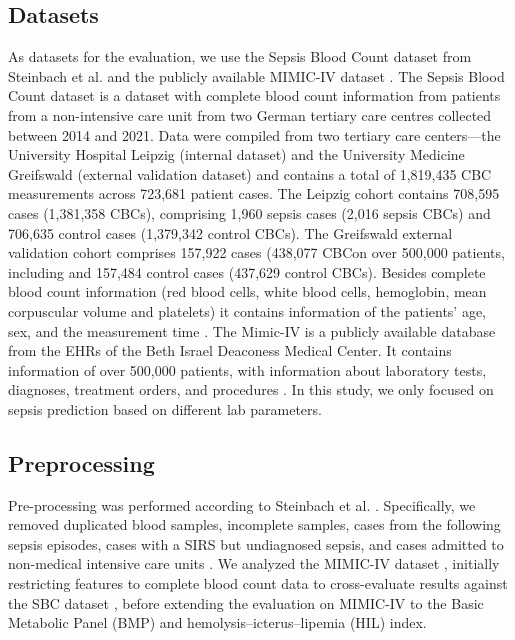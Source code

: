 \documentclass[pdflatex,sn-mathphys-num,lineno]{sn-jnl}
\theoremstyle{thmstyleone}%
\theoremstyle{thmstyletwo}%
\theoremstyle{thmstylethree}%
\begin{document}
\subsection{Datasets}\label{methods:datasets}
As datasets for the evaluation, we use the Sepsis Blood Count dataset from Steinbach et al. \cite{steinbach2024applying} and the publicly available MIMIC-IV dataset \cite{johnson2023mimic}. 
The Sepsis Blood Count dataset is a dataset with complete blood count information from patients from a non-intensive care unit from two German tertiary care centres collected between 2014 and 2021. Data were compiled from two tertiary care centers—the University Hospital Leipzig (internal dataset) and the University Medicine Greifswald (external validation dataset) and contains a total of 1,819,435 CBC measurements across 723,681 patient cases. The Leipzig cohort contains 708,595 cases (1,381,358 CBCs), comprising 1,960 sepsis cases (2,016 sepsis CBCs) and 706,635 control cases (1,379,342 control CBCs). The Greifswald external validation cohort comprises 157,922 cases (438,077 CBCon over 500,000 patients, including and 157,484 control cases (437,629 control CBCs). Besides complete blood count information (red blood cells, white blood cells, hemoglobin, mean corpuscular volume and platelets) it contains information of the patients' age, sex, and the measurement time \cite{steinbach2024applying}. 
The Mimic-IV \cite{johnson2023mimic} is a publicly available database from the EHRs of the Beth Israel Deaconess Medical Center. It contains information of over 500,000 patients, with information about laboratory tests, diagnoses, treatment orders, and procedures \cite{johnson2023mimic}. In this study, we only focused on sepsis prediction based on different lab parameters.

\subsection{Preprocessing}\label{methods:preprocessing}
Pre-processing was performed according to Steinbach et al. \cite{steinbach2024applying}. Specifically, we removed duplicated blood samples, incomplete samples, cases from the following sepsis episodes, cases with a SIRS but undiagnosed sepsis, and cases admitted to non-medical intensive care units \cite{steinbach2024applying}. We analyzed the MIMIC-IV dataset \cite{johnson2023mimic}, initially restricting features to complete blood count data to cross-evaluate results against the SBC dataset \cite{steinbach2024applying}, before extending the evaluation on MIMIC-IV to the Basic Metabolic Panel (BMP) and hemolysis–icterus–lipemia (HIL) index. 
\end{document}

